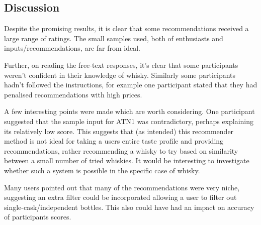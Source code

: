 \subsection{Discussion}\label{sec:disc}
Despite the promising results, it is clear that some 
recommendations received a large range of ratings.  The small samples used, both of enthusiasts and 
inputs/recommendations, are far from ideal.

Further, on reading the free-text responses, it's clear that some participants weren't confident
in their knowledge of whisky. Similarly some participants hadn't followed the instructions, for example
one participant stated that they had penalised recommendations with high prices.

A few interesting points were made which are worth considering.  One participant suggested that the sample input
for ATN1 was contradictory, perhaps explaining its relatively low score. This suggests that (as intended) this 
recommender method is not ideal for taking a users entire taste profile and providing recommendations, 
rather recommending a whisky to try based on similarity between a small number of tried whiskies.  It would
be interesting to investigate whether such a system is possible in the specific case of whisky.

Many users pointed out that many of the recommendations were very niche, suggesting an extra filter could be
incorporated allowing a user to filter out single-cask/independent bottles.  This also could have had an 
impact on accuracy of participants scores.